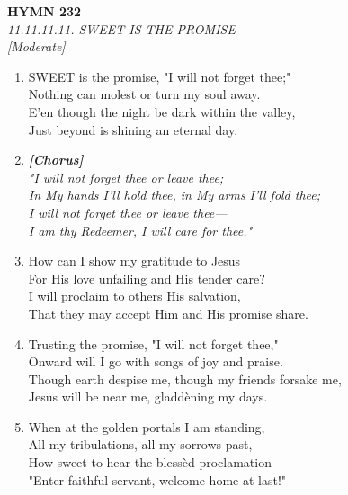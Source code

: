 \documentclass[11pt,a4paper]{article}
\begin{document}
\newpage
\begin{center}
    {\Large \textbf{HYMN 232}}
    \\
    \textit{11.11.11.11. SWEET IS THE PROMISE}
    \\
    \textit{\small [Moderate]}
\end{center}
\vspace{1em}

\begin{enumerate}
    \item SWEET is the promise, "I will not forget thee;" \\
        Nothing can molest or turn my soul away. \\
        E'en though the night be dark within the valley, \\
        Just beyond is shining an eternal day.

    \item[] \vspace{0.4em}
    \textbf{\textit{[Chorus]}} \\
    \textit{"I will not forget thee or leave thee;} \\
    \textit{In My hands I'll hold thee, in My arms I'll fold thee;} \\
    \textit{I will not forget thee or leave thee---} \\
    \textit{I am thy Redeemer, I will care for thee."}
    \vspace{0.4em}

    \item How can I show my gratitude to Jesus \\
        For His love unfailing and His tender care? \\
        I will proclaim to others His salvation, \\
        That they may accept Him and His promise share.

    \item Trusting the promise, "I will not forget thee," \\
        Onward will I go with songs of joy and praise. \\
        Though earth despise me, though my friends forsake me, \\
        Jesus will be near me, gladd\`ening my days.

    \item When at the golden portals I am standing, \\
        All my tribulations, all my sorrows past, \\
        How sweet to hear the bless\`ed proclamation--- \\
        "Enter faithful servant, welcome home at last!"

\end{enumerate}
\end{document}
